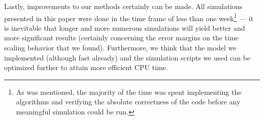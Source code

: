Lastly, improvements to our methods certainly can be made. All simulations presented in this paper were done in the time frame of less than one week\footnote{As was mentioned, the majority of the time was spent implementing the algorithms and verifying the absolute correctness of the code before any meaningful simulation could be run.}
--- it is inevitable that longer and more numerous simulations will yield better and more significant results (certainly concerning the error margins on the time scaling behavior that we found). Furthermore, we think that the model we implemented (although fast already) and the simulation scripts we used can be optimized further to attain more efficient CPU time.

